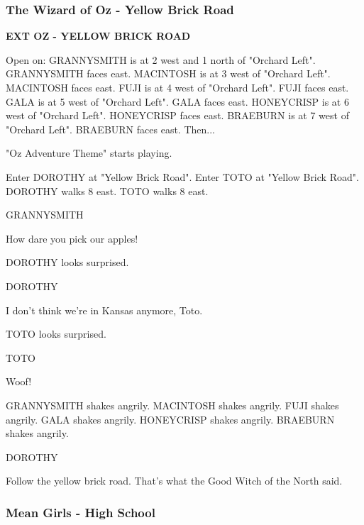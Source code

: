\documentclass[11pt,letterpaper,oldstylefigures]{memoir}
\newcommand{\slugline}[1]{\nobreak\textbf{\MakeUppercase{#1}}\par\nobreak\vspace{1\baselineskip}}
\newcommand{\speaker}[1]{\nobreak\hspace*{0.333\textwidth}\MakeUppercase{#1}\par\nobreak\vspace{0.5\baselineskip}}
\newcommand{\dialogue}[1]{\nobreak\hspace*{0.25\textwidth}\begin{minipage}{0.5\textwidth}#1\end{minipage}\par\vspace{1\baselineskip}}
\newcommand{\stagedir}[1]{#1\par\vspace{1\baselineskip}}
\newenvironment{FountainExample}
  {\begingroup
  \ttfamily\small
   \setlength{\parindent}{0pt}
  \setlength{\parskip}{0.5em}
  \allowdisplaybreaks
  \setlength{\displaywidowpenalty}{0}
  \setlength{\widowpenalty}{0}
  \setlength{\clubpenalty}{0}
  \setlength{\interlinepenalty}{0}
}
  {\endgroup}
\newcommand{\paragraphbreak}{\vspace{0.5em}}
\begin{document}
\paragraphbreak

\subsubsection*{The Wizard of Oz - Yellow Brick Road}
\label{ex:wizard-of-oz-yellow-brick-road}

\begin{FountainExample}
\slugline{EXT OZ - YELLOW BRICK ROAD}

\stagedir{Open on: GRANNYSMITH is at 2 west and 1 north of "Orchard Left". GRANNYSMITH faces east. MACINTOSH is at 3 west of "Orchard Left". MACINTOSH faces east. FUJI is at 4 west of "Orchard Left". FUJI faces east. GALA is at 5 west of "Orchard Left". GALA faces east. HONEYCRISP is at 6 west of "Orchard Left". HONEYCRISP faces east. BRAEBURN is at 7 west of "Orchard Left". BRAEBURN faces east. Then...}
\stagedir{"Oz Adventure Theme" starts playing.}
\stagedir{Enter DOROTHY at "Yellow Brick Road". Enter TOTO at "Yellow Brick Road". DOROTHY walks 8 east. TOTO walks 8 east.}

\speaker{GRANNYSMITH}
\dialogue{How dare you pick our apples!}

\stagedir{DOROTHY looks surprised.}

\speaker{DOROTHY}
\dialogue{I don't think we're in Kansas anymore, Toto.}

\stagedir{TOTO looks surprised.}

\speaker{TOTO}
\dialogue{Woof!}

\stagedir{GRANNYSMITH shakes angrily. MACINTOSH shakes angrily. FUJI shakes angrily. GALA shakes angrily. HONEYCRISP shakes angrily. BRAEBURN shakes angrily.}

\speaker{DOROTHY}
\dialogue{Follow the yellow brick road. That's what the Good Witch of the North said.}
\end{FountainExample}

\paragraphbreak

\subsubsection*{Mean Girls - High School}
\label{ex:mean-girls-high-school}
\end{document}
